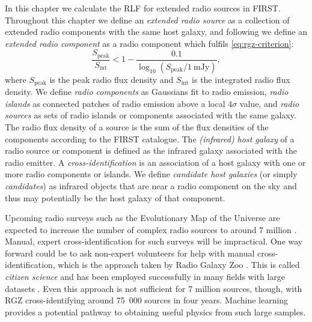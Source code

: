 \documentclass[11pt, a4paper]{book}
\newcommand{\defn}[1]{\emph{#1}}
\begin{document}
In this chapter we calculate the RLF for extended radio sources in FIRST. Throughout this chapter we define an \defn{extended radio source} as a collection of extended radio components with the same host galaxy, and following
\citet{banfield15} we define an \defn{extended radio component} as a radio
component which fulfils \autoref{eq:rgz-criterion}:
\begin{equation}
    \frac{S_{\mathrm{peak}}}{S_{\mathrm{int}}} < 1 - \frac{0.1}{\log_{10}(S_{\mathrm{peak}} / 1\ \mathrm{mJy})},
    \label{eq:rgz-criterion}
\end{equation}
where $S_{\mathrm{peak}}$ is the peak radio flux density and
$S_{\mathrm{int}}$ is the integrated radio flux density. We define \defn{radio components} as Gaussians fit to
radio emission, \defn{radio islands} as connected patches of radio emission
above a local $4\sigma$ value, and \defn{radio sources} as sets of radio
islands or components associated with the same galaxy. The radio flux density of a source is the sum of the flux densities of the components according to the FIRST catalogue. The \defn{(infrared)
host galaxy} of a radio source or component is defined as the infrared galaxy
associated with the radio emitter. A \defn{cross-identification} is an
association of a host galaxy with one or more radio components or islands. We
define \defn{candidate host galaxies} (or simply
\defn{candidates}) as infrared objects that are near a radio component on
the sky and thus may potentially be the host galaxy of that component.

Upcoming
radio surveys such as the Evolutionary Map of the Universe
\citep[EMU;][]{norris11} are expected to increase the number
of complex radio sources to around 7 million \citep{banfield15}. Manual, expert cross-identification for such surveys will be impractical. One way forward could be to ask non-expert volunteers for help with manual cross-identification, which is the approach taken by Radio Galaxy Zoo \citep[RGZ;][]{banfield15}. This is called \defn{citizen science} and has been employed successfully in many fields with large datasets \citep{marshall15citizen}. Even this approach is not sufficient for 7 million sources, though, with RGZ cross-identifying around 75~000 sources in four years. Machine
learning provides a potential pathway to obtaining useful physics from such
large samples.
\end{document}
